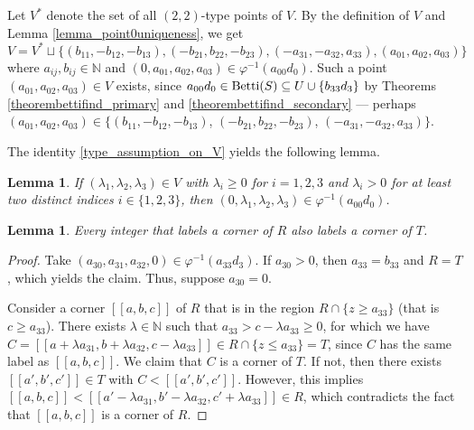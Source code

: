 \documentclass[12pt]{article}
\newtheorem{lemma}[thm]{Lemma}
\theoremstyle{remark}
\begin{document}
Let $V^*$ denote the set of all $(2,2)$-type points of $V$. By the definition of $V$ and Lemma \ref{lemma_point0uniqueness}, we get
\begin{equation}\label{type_assumption_on_V}
    V = V^* \sqcup \{(b_{11},-b_{12},-b_{13}), (-b_{21},b_{22},-b_{23}), (-a_{31},-a_{32},a_{33}), (a_{01},a_{02},a_{03})\}
\end{equation}
where $a_{ij},b_{ij} \in \mathbb{N}$ and $(0,a_{01},a_{02},a_{03}) \in \varphi^{-1}(a_{00}d_0)$. Such a point $(a_{01},a_{02},a_{03}) \in V$ exists, since $a_{00}d_0 \in \textup{Betti}(S) \subseteq U \cup \{b_{33}d_3\}$ by Theorems \ref{theorembettifind_primary} and \ref{theorembettifind_secondary} --- perhaps $(a_{01},a_{02},a_{03}) \in \{(b_{11},-b_{12},-b_{13})$, $(-b_{21},b_{22},-b_{23})$, $(-a_{31},-a_{32},a_{33}) \}$. 

The identity \eqref{type_assumption_on_V} yields the following lemma.



\begin{lemma}\label{lemma_point0connection}
    If $(\lambda_1,\lambda_2,\lambda_3) \in V$ with $\lambda_i \geq 0$ for $i=1,2,3$ and $\lambda_i > 0$ for at least two distinct indices $i \in \{1,2,3\}$, then $(0,\lambda_1,\lambda_2,\lambda_3) \in \varphi^{-1}(a_{00}d_0)$.
\end{lemma}









\begin{lemma}\label{lemma_cornerlabelRT}
    Every integer that labels a corner of $R$ also labels a corner of $T$.
\end{lemma}

\begin{proof}
Take $(a_{30},a_{31},a_{32},0) \in \varphi^{-1}(a_{33}d_3)$. If $a_{30}>0$, then $a_{33}=b_{33}$ and $R = T$, which yields the claim. Thus, suppose $a_{30} =0$.

Consider a corner $[[a,b,c]]$ of $R$ that is in the region $R \cap \{z \geq a_{33}\}$ (that is $c \geq a_{33}$). There exists $\lambda \in \mathbb{N}$ such that $a_{33} > c- \lambda a_{33} \geq 0$, for which we have $C = [[a + \lambda a_{31},b + \lambda a_{32},c- \lambda a_{33}]] \in  R \cap \{z \leq a_{33}\} = T$, since $C$ has the same label as $[[a,b,c]]$. 
We claim that $C$ is a corner of $T$. If not, then there exists $[[a',b',c']] \in T $ with $C <  [[a',b',c']]$. However, this implies $[[a,b,c]] < [[a' -\lambda a_{31},b'-\lambda a_{32},c' + \lambda a_{33} ]] \in R$, which contradicts the fact that $[[a,b,c]]$ is a corner of $R$.
\end{proof}
\end{document}
